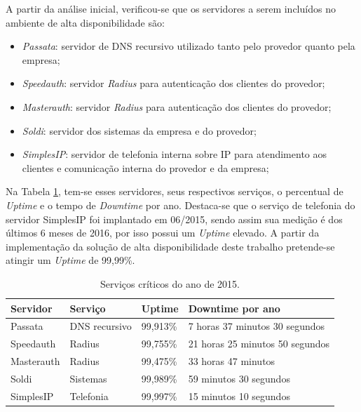 A partir da análise inicial, verificou-se que os servidores a serem incluídos no ambiente de alta disponibilidade são:
\begin{itemize}
 \item \textit{Passata}: servidor de \ac{DNS} recursivo utilizado tanto pelo provedor quanto pela empresa;
 \item \textit{Speedauth}: servidor \textit{Radius} para autenticação dos clientes do provedor;
 \item \textit{Masterauth}: servidor \textit{Radius} para autenticação dos clientes do provedor;
 \item \textit{Soldi}: servidor dos sistemas da empresa e do provedor;
 \item \textit{SimplesIP}: servidor de telefonia interna sobre \ac{IP} para atendimento aos clientes e comunicação interna do provedor e da empresa;
\end{itemize}

Na Tabela \ref{tab:dispservcrit}, tem-se esses servidores, seus respectivos serviços, o percentual de \textit{Uptime} e o tempo de 
\textit{Downtime} por ano. Destaca-se que o serviço de telefonia do servidor SimplesIP foi implantado em 06/2015, sendo assim sua medição é dos 
últimos 6 meses de 2016, por isso possui um \textit{Uptime} elevado.
A partir da implementação da solução de alta disponibilidade deste trabalho pretende-se atingir um \textit{Uptime} de 99,99\%.

\begin{table}[h!]
\caption{Serviços críticos do ano de 2015.}
\label{tab:dispservcrit}
\begin{center}
\begin{tabular}{|l|l|l|l|}\hline
\textbf{Servidor} & \textbf{Serviço} & \textbf{Uptime} & \textbf{Downtime por ano} \\\hline
Passata & DNS recursivo & 99,913\% & 7 horas 37 minutos 30 segundos \\\hline
Speedauth & Radius & 99,755\% & 21 horas 25 minutos 50 segundos \\\hline
Masterauth & Radius & 99,475\% & 33 horas 47 minutos \\\hline
Soldi & Sistemas & 99,989\% & 59 minutos 30 segundos \\\hline
SimplesIP & Telefonia & 99,997\% & 15 minutos 10 segundos \\\hline %
\end{tabular}
\end{center}
\end{table}

